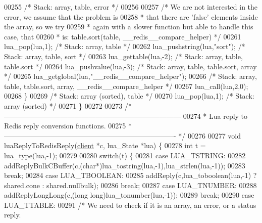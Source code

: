 \begin{DoxyCode}
{{00255         \textcolor{comment}{/* Stack: array, table, error */}
00256 
00257         \textcolor{comment}{/* We are not interested in the error, we assume that the problem is}
00258 \textcolor{comment}{         * that there are 'false' elements inside the array, so we try}
00259 \textcolor{comment}{         * again with a slower function but able to handle this case, that}
00260 \textcolor{comment}{         * is: table.sort(table, \_\_redis\_\_compare\_helper) */}
00261         lua\_pop(lua,1);             \textcolor{comment}{/* Stack: array, table */}
00262         lua\_pushstring(lua,\textcolor{stringliteral}{"sort"}); \textcolor{comment}{/* Stack: array, table, sort */}
00263         lua\_gettable(lua,-2);       \textcolor{comment}{/* Stack: array, table, table.sort */}
00264         lua\_pushvalue(lua,-3);      \textcolor{comment}{/* Stack: array, table, table.sort, array */}
00265         lua\_getglobal(lua,\textcolor{stringliteral}{"\_\_redis\_\_compare\_helper"});
00266         \textcolor{comment}{/* Stack: array, table, table.sort, array, \_\_redis\_\_compare\_helper */}
00267         lua\_call(lua,2,0);
00268     \}
00269     \textcolor{comment}{/* Stack: array (sorted), table */}
00270     lua\_pop(lua,1);             \textcolor{comment}{/* Stack: array (sorted) */}
00271 \}
00272 
00273 \textcolor{comment}{/* ---------------------------------------------------------------------------}
00274 \textcolor{comment}{ * Lua reply to Redis reply conversion functions.}
00275 \textcolor{comment}{ * ------------------------------------------------------------------------- */}
00276 
00277 \textcolor{keywordtype}{void} luaReplyToRedisReply(\hyperlink{structclient}{client} *c, lua\_State *lua) \{
00278     \textcolor{keywordtype}{int} t = lua\_type(lua,-1);
00279 
00280     \textcolor{keywordflow}{switch}(t) \{
00281     \textcolor{keywordflow}{case} LUA\_TSTRING:
00282         addReplyBulkCBuffer(c,(\textcolor{keywordtype}{char}*)lua\_tostring(lua,-1),lua\_strlen(lua,-1));
00283         \textcolor{keywordflow}{break};
00284     \textcolor{keywordflow}{case} LUA\_TBOOLEAN:
00285         addReply(c,lua\_toboolean(lua,-1) ? shared.cone : shared.nullbulk);
00286         \textcolor{keywordflow}{break};
00287     \textcolor{keywordflow}{case} LUA\_TNUMBER:
00288         addReplyLongLong(c,(\textcolor{keywordtype}{long} \textcolor{keywordtype}{long})lua\_tonumber(lua,-1));
00289         \textcolor{keywordflow}{break};
00290     \textcolor{keywordflow}{case} LUA\_TTABLE:
00291         \textcolor{comment}{/* We need to check if it is an array, an error, or a status reply.}
}}
\end{DoxyCode}

